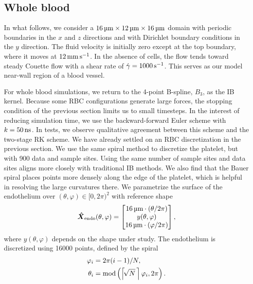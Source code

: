 \subsection{Whole blood}\label{sec:whole-blood}

In what follows, we consider a $16\um\times12\um\times16\um$ domain with periodic boundaries in the $x$ and $z$
directions and with Dirichlet boundary conditions in the $y$ direction. The fluid velocity is initially zero
except at the top boundary, where it moves at $12\mmpersec$. In the absence of cells, the flow tends toward steady
Couette flow with a shear rate of $\shear=1000\persec$. This serves as our model near-wall region of a blood
vessel.

For whole blood simulations, we return to the 4-point B-spline, $B_3$, as the IB kernel.  Because some RBC
configurations generate large forces, the stopping condition of the previous section limits us to small timesteps.
In the interest of reducing simulation time, we use the backward-forward Euler scheme with $\timestep=50\ns$. In
tests, we observe qualitative agreement between this scheme and the two-stage RK scheme. We have already settled
on an RBC discretization in the previous section. We use the same spiral method to discretize the platelet, but
with 900 data and sample sites. Using the same number of sample sites and data sites aligns more closely with
traditional IB methods. We also find that the Bauer spiral places points more densely along the edge of the
platelet, which is helpful in resolving the large curvatures there. We parametrize the surface of the endothelium
over $(\theta, \varphi)\in{[0, 2\pi)}^2$ with reference shape
\begin{equation}
    \vec{\hat{X}}_\text{endo}(\theta, \varphi) = \begin{bmatrix}
            16\um\cdot(\theta/2\pi)  \\
            y(\theta, \varphi) \\
            16\um\cdot(\varphi/2\pi)
    \end{bmatrix},
\end{equation}
where $y(\theta, \varphi)$ depends on the shape under study. The endothelium is discretized using 16000 points,
defined by the spiral
\begin{equation}
    \begin{aligned}
    \varphi_i &= 2\pi (i-1)/N, \\
    \theta_i &= \modulo\left(\left\lceil\!\sqrt{N}\mskip\thinmuskip\right\rceil\varphi_i, 2\pi\right).
    \end{aligned}
\end{equation}
